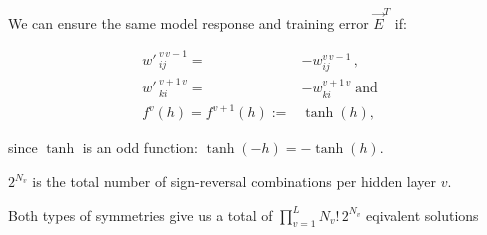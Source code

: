 \begin{frame}\frametitle{\subsecname}


We can ensure the same model response and training error $\vec E^{T}$ if:


\begin{align}
{w'\,}^{v\,v-1}_{ij} =& -w^{v\,v-1}_{ij}\,,\\
{w'\,}^{v+1\,v}_{ki} =& -w^{v+1\,v}_{ki} \; \text{and}\\
f^{v}(h) = f^{v+1}(h) :=& \tanh(h),
\end{align}

since $\tanh$ is an odd function: $\tanh(-h) = -\tanh(h)$.

$2^{N_{v}}$ is the total number of sign-reversal combinations per hidden layer $v$.

Both types of symmetries give us 
a total of $\prod_{v=1}^{L} N_{v}!\, 2^{N_{v}}$ eqivalent solutions

  
\end{frame}

